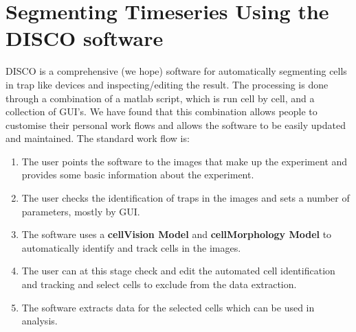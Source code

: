\section{Segmenting Timeseries Using the DISCO software}
\label{sec:segmenting_timeseries}
DISCO is a comprehensive (we hope) software for automatically segmenting cells in trap like devices and inspecting/editing the result. The processing is done through a combination of a matlab script, which is run cell by cell, and a collection of GUI's. We have found that this combination allows people to customise their personal work flows and allows the software to be easily updated and maintained. The standard work flow is:
\begin{enumerate}
	\item The user points the software to the images that make up the experiment and provides some basic information about the experiment.
	\item The user checks the identification of traps in the images and sets a number of parameters, mostly by GUI.
	\item The software uses a \textbf{cellVision Model} and \textbf{cellMorphology Model} to automatically identify and track cells in the images.
	\item The user can at this stage check and edit the automated cell identification and tracking and select cells to exclude from the data extraction.
	\item The software extracts data for the selected cells which can be used in analysis.
\end{enumerate}
